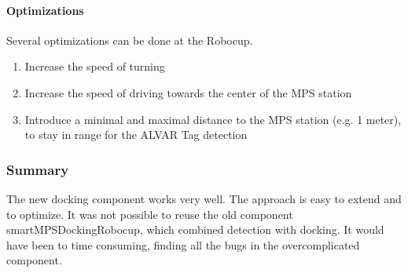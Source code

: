 \paragraph{Optimizations}
Several optimizations can be done at the Robocup. 

\begin{enumerate}
\item Increase the speed of turning
\item Increase the speed of driving towards the center of the MPS station
\item Introduce a minimal and maximal distance to the MPS station (e.g. 1 meter), to stay in range for the ALVAR Tag detection
\end{enumerate}


\subsubsection{Summary}
The new docking component works very well. The approach is easy to extend and to optimize. It was not possible to reuse the old component smartMPSDockingRobocup, which combined detection with docking. It would have been to time consuming, finding all the bugs in the overcomplicated component. 
